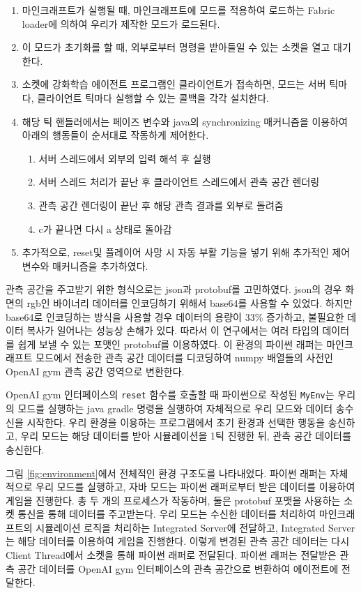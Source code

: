 \documentclass[oneside, under, ko]{snuthesis}
\begin{document}
\begin{enumerate}
    \item 마인크래프트가 실행될 때, 마인크래프트에 모드를 적용하여 로드하는 Fabric loader에 의하여 우리가 제작한 모드가 로드된다.
    \item 이 모드가 초기화를 할 때, 외부로부터 명령을 받아들일 수 있는 소켓을 열고 대기한다.
    \item 소켓에 강화학습 에이전트 프로그램인 클라이언트가 접속하면, 모드는 서버 틱마다, 클라이언트 틱마다 실행할 수 있는 콜백을 각각 설치한다.
    \item 해당 틱 핸들러에서는 페이즈 변수와 java의 synchronizing 매커니즘을 이용하여 아래의 행동들이 순서대로 작동하게 제어한다.
    \begin{enumerate}
        \item 서버 스레드에서 외부의 입력 해석 후 실행
        \item 서버 스레드 처리가 끝난 후 클라이언트 스레드에서 관측 공간 렌더링
        \item 관측 공간 렌더링이 끝난 후 해당 관측 결과를 외부로 돌려줌
        \item c가 끝나면 다시 a 상태로 돌아감
    \end{enumerate}
\item 추가적으로, reset및 플레이어 사망 시 자동 부활 기능을 넣기 위해 추가적인 제어 변수와 매커니즘을 추가하였다.
\end{enumerate}

관측 공간을 주고받기 위한 형식으로는 json과 protobuf를 고민하였다. json의 경우 화면의 rgb인 바이너리 데이터를 인코딩하기 위해서 base64를 사용할 수 있었다. 하지만 base64로 인코딩하는 방식을 사용할 경우 데이터의 용량이 33\% 증가하고, 불필요한 데이터 복사가 일어나는 성능상 손해가 있다. 따라서 이 연구에서는 여러 타입의 데이터를 쉽게 보낼 수 있는 포맷인 protobuf를 이용하였다. 이 환경의 파이썬 래퍼는 마인크래프트 모드에서 전송한 관측 공간 데이터를 디코딩하여 numpy 배열들의 사전인 OpenAI gym 관측 공간 영역으로 변환한다.

OpenAI gym 인터페이스\cite{gym}의 \lstinline{reset} 함수를 호출할 때 파이썬으로 작성된 \lstinline{MyEnv}는 우리의 모드를 실행하는 java gradle 명령을 실행하여 자체적으로 우리 모드와 데이터 송수신을 시작한다. 우리 환경을 이용하는 프로그램에서 초기 환경과 선택한 행동을 송신하고, 우리 모드는 해당 데이터를 받아 시뮬레이션을 1틱 진행한 뒤, 관측 공간 데이터를 송신한다.

그림 \ref{fig:environment}에서 전체적인 환경 구조도를 나타내었다. 파이썬 래퍼는 자체적으로 우리 모드를 실행하고, 자바 모드는 파이썬 래퍼로부터 받은 데이터를 이용하여 게임을 진행한다. 총 두 개의 프로세스가 작동하며, 둘은 protobuf 포맷을 사용하는 소켓 통신을 통해 데이터를 주고받는다. 우리 모드는 수신한 데이터를 처리하여 마인크래프트의 시뮬레이션 로직을 처리하는 Integrated Server에 전달하고, Integrated Server는 해당 데이터를 이용하여 게임을 진행한다. 이렇게 변경된 관측 공간 데이터는 다시 Client Thread에서 소켓을 통해 파이썬 래퍼로 전달된다. 파이썬 래퍼는 전달받은 관측 공간 데이터를 OpenAI gym 인터페이스의 관측 공간으로 변환하여 에이전트에 전달한다.
\end{document}
